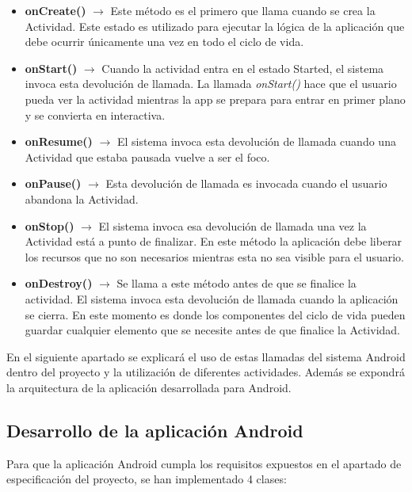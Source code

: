 \begin {itemize}
\item \textbf{onCreate()} $\rightarrow$ Este m\'etodo es el primero que llama cuando se crea la Actividad. Este estado es utilizado para ejecutar la l\'ogica de la aplicaci\'on que debe ocurrir \'unicamente una vez en todo el ciclo de vida.
\item \textbf{onStart()} $\rightarrow$ Cuando la actividad entra en el estado Started, el sistema invoca esta devoluci\'on de llamada. La llamada \textit{onStart()} hace que el usuario pueda ver la actividad mientras la app se prepara para entrar en primer plano y se convierta en interactiva.
\item \textbf{onResume()} $\rightarrow$  El sistema invoca esta devoluci\'on de llamada cuando una Actividad que estaba pausada vuelve a ser el foco.
\item \textbf{onPause()} $\rightarrow$ Esta devoluci\'on de llamada es invocada cuando el usuario abandona la Actividad. 
\item \textbf{onStop()} $\rightarrow$ El sistema invoca esa devoluci\'on de llamada una vez la Actividad est\'a a punto de finalizar. En este m\'etodo la aplicaci\'on debe liberar los recursos que no son necesarios mientras esta no sea visible para el usuario.
\item \textbf{onDestroy()} $\rightarrow$ Se llama a este m\'etodo antes de que se finalice la actividad. El sistema invoca esta devoluci\'on de llamada cuando la aplicaci\'on se cierra. En este momento es donde los componentes del ciclo de vida pueden guardar cualquier elemento que se necesite antes de que finalice la Actividad. 
\end {itemize}

En el siguiente apartado se explicar\'a el uso de estas llamadas del sistema Android dentro del proyecto y la utilizaci\'on de diferentes actividades. Adem\'as se expondr\'a la arquitectura de la aplicaci\'on desarrollada para Android.\\


\subsection {Desarrollo de la aplicaci\'on Android}

Para que la aplicaci\'on Android cumpla los requisitos expuestos en el apartado de especificaci\'on del proyecto, se han implementado 4 clases:\\

